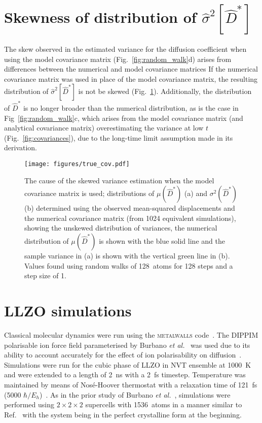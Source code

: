 \documentclass[reprint,superscriptaddress,nobibnotes,amsmath,amssymb,aps,prx,hidelinks]{revtex4-2}
\newcommand{\Dest}{\ensuremath{\widehat{D}^*}}
\newcommand{\varest}[1]{\ensuremath{\widehat{\sigma}^2[#1]}}
\begin{document}
\section{Skewness of distribution of $\varest{\Dest}$}
\label{sec:skew}
%
The skew observed in the estimated variance for the diffusion coefficient when using the model covariance matrix (Fig.~\ref{fig:random_walk}d) arises from differences between the numerical and model covariance matrices
If the numerical covariance matrix was used in place of the model covariance matrix, the resulting distribution of $\varest{\Dest}$ is not be skewed (Fig.~\ref{fig:true_cov}).
Additionally, the distribution of $\Dest$ is no longer broader than the numerical distribution, as is the case in Fig~\ref{fig:random_walk}c, which arises from the model covariance matrix (and analytical covariance matrix) overestimating the variance at low $t$ (Fig.~\ref{fig:covariances}), due to the long-time limit assumption made in its derivation.
%
\begin{figure}
    \centering
    \texttt{[image: figures/true\_cov.pdf]}
    \caption{
        The cause of the skewed variance estimation when the model covariance matrix is used; 
        distributions of $\mu(\Dest)$ (a) and $\sigma^2(\Dest)$ (b) determined using the observed mean-squared displacements and the numerical covariance matrix (from \num{1024} equivalent simulations), showing the unskewed distribution of variances, the numerical distribution of $\mu(\Dest)$ is shown with the blue solid line and the sample variance in (a) is shown with the vertical green line in (b).
        Values found using random walks of \SI{128}{atoms} for \num{128} steps and a step size of \num{1}. 
        }
    \label{fig:true_cov}
\end{figure}
%

\section{LLZO simulations}
%
Classical molecular dynamics were run using the \textsc{metalwalls} code~\cite{marin_metalwalls_2020}. 
The DIPPIM polarisable ion force field parameterised by Burbano \emph{et al.}~\cite{burbano_sparse_2016} was used due to its ability to account accurately for the effect of ion polarisability on diffusion~\cite{wilson_polarization_1993,burbano_sparse_2016}. 
Simulations were run for the cubic phase of LLZO in NVT ensemble at \SI{1000}{\kelvin} and were extended to a length of \SI{2}{\nano\second} with a \SI{2}{\femto\second} timestep. 
Temperature was maintained by means of Nos\'{e}-Hoover thermostat with a relaxation time of \SI{121}{\femto\second} (5000 $\hbar / E_{h}$)~\cite{nose_unified_1984,hoover_canonical_1985,martyna_nose_1992}. 
As in the prior study of Burbano \emph{et al.}~\cite{burbano_sparse_2016}, simulations were performed using $2 \times 2 \times 2$ supercells with \SI{1536}{atoms} in a manner similar to Ref.~ with the system being in the perfect crystalline form at the beginning.
\end{document}
